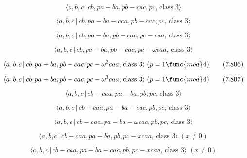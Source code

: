 \documentclass[10pt]{article}
\begin{document}
\begin{equation}
\langle a,b,c\,|\,cb,pa-ba,pb-cac,pc,\,\text{class }3\rangle  \tag{7.802}
\end{equation}

\begin{equation}
\langle a,b,c\,|\,cb,pa-ba-caa,pb-cac,pc,\,\text{class }3\rangle  \tag{7.803}
\end{equation}

\begin{equation}
\langle a,b,c\,|\,cb,pa-ba,pb-cac,pc-caa,\,\text{class }3\rangle  \tag{7.804}
\end{equation}

\begin{equation}
\langle a,b,c\,|\,cb,pa-ba,pb-cac,pc-\omega caa,\,\text{class }3\rangle 
\tag{7.805}
\end{equation}

\begin{equation}
\langle a,b,c\,|\,cb,pa-ba,pb-cac,pc-\omega ^{2}caa,\,\text{class }3\rangle
\;(p=1\func{mod}4)  \tag{7.806}
\end{equation}

\begin{equation}
\langle a,b,c\,|\,cb,pa-ba,pb-cac,pc-\omega ^{3}caa,\,\text{class }3\rangle
\;(p=1\func{mod}4)  \tag{7.807}
\end{equation}

\begin{equation}
\langle a,b,c\,|\,cb-caa,pa-ba,pb,pc,\,\text{class }3\rangle  \tag{7.808}
\end{equation}

\begin{equation}
\langle a,b,c\,|\,cb-caa,pa-ba-cac,pb,pc,\,\text{class }3\rangle  \tag{7.809}
\end{equation}

\begin{equation}
\langle a,b,c\,|\,cb-caa,pa-ba-\omega cac,pb,pc,\,\text{class }3\rangle 
\tag{7.810}
\end{equation}

\begin{equation}
\langle a,b,c\,|\,cb-caa,pa-ba,pb,pc-xcaa,\,\text{class }3\rangle \;(x \neq
0)  \tag{7.811}
\end{equation}

\begin{equation}
\langle a,b,c\,|\,cb-caa,pa-ba-cac,pb,pc-xcaa,\,\text{class }3\rangle \;(x
\neq 0)  \tag{7.812}
\end{equation}
\end{document}
